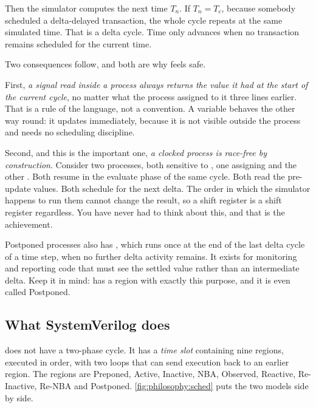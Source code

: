Then the simulator computes the next time $T_n$. If $T_n = T_c$, because
somebody scheduled a delta-delayed transaction, the whole cycle repeats at the
same simulated time. That is a delta cycle. Time only advances when no
transaction remains scheduled for the current time.

Two consequences follow, and both are why \VHDL{} feels safe.

First, \emph{a signal read inside a process always returns the value it had at
the start of the current cycle}, no matter what the process assigned to it
three lines earlier. That is a rule of the language, not a convention. A
variable behaves the other way round: it updates immediately, because it is not
visible outside the process and needs no scheduling discipline.

Second, and this is the important one, \emph{a clocked \VHDL{} process is
race-free by construction}. Consider two processes, both sensitive to
, one assigning  and the other . Both
resume in the evaluate phase of the same cycle. Both read the pre-update values.
Both schedule for the next delta. The order in which the simulator happens to
run them cannot change the result, so a shift register is a shift register
regardless. You have never had to think about this, and that is the achievement.

\begin{notebox}{Postponed processes}
\VHDL{} also has , which runs once at the end of the
last delta cycle of a time step, when no further delta activity remains. It
exists for monitoring and reporting code that must see the settled value rather
than an intermediate delta. Keep it in mind: \SV{} has a region with exactly
this purpose, and it is even called Postponed.
\end{notebox}

\subsection{What SystemVerilog does}

\SV{} does not have a two-phase cycle. It has a
\emph{time slot} containing nine regions, executed in order, with two loops
that can send execution back to an earlier region. The regions are Preponed,
Active, Inactive, NBA, Observed, Reactive, Re-Inactive, Re-NBA and Postponed.
\cref{fig:philosophy:sched} puts the two models side by side.

